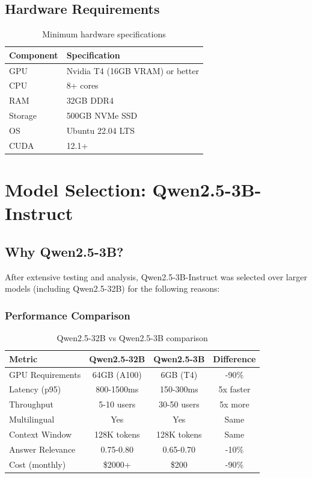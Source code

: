 \documentclass[12pt,a4paper]{article}
\begin{document}
\subsection{Hardware Requirements}

\begin{table}[H]
\centering
\caption{Minimum hardware specifications}
\begin{tabular}{@{}ll@{}}
\toprule
\textbf{Component} & \textbf{Specification} \\ \midrule
GPU & Nvidia T4 (16GB VRAM) or better \\
CPU & 8+ cores \\
RAM & 32GB DDR4 \\
Storage & 500GB NVMe SSD \\
OS & Ubuntu 22.04 LTS \\
CUDA & 12.1+ \\ \bottomrule
\end{tabular}
\end{table}

\section{Model Selection: Qwen2.5-3B-Instruct}

\subsection{Why Qwen2.5-3B?}

After extensive testing and analysis, Qwen2.5-3B-Instruct was selected over larger models (including Qwen2.5-32B) for the following reasons:

\subsubsection{Performance Comparison}

\begin{table}[H]
\centering
\caption{Qwen2.5-32B vs Qwen2.5-3B comparison}
\begin{tabular}{@{}lccc@{}}
\toprule
\textbf{Metric} & \textbf{Qwen2.5-32B} & \textbf{Qwen2.5-3B} & \textbf{Difference} \\ \midrule
GPU Requirements & 64GB (A100) & 6GB (T4) & -90\% \\
Latency (p95) & 800-1500ms & 150-300ms & 5x faster \\
Throughput & 5-10 users & 30-50 users & 5x more \\
Multilingual & Yes & Yes & Same \\
Context Window & 128K tokens & 128K tokens & Same \\
Answer Relevance & 0.75-0.80 & 0.65-0.70 & -10\% \\
Cost (monthly) & \$2000+ & \$200 & -90\% \\ \bottomrule
\end{tabular}
\end{table}
\end{document}
